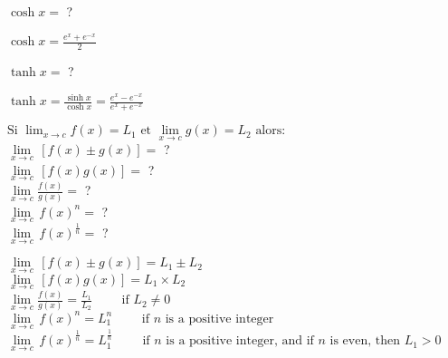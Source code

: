\documentclass[12pt]{article}
\newcommand*{\xfield}[1]{\begin{mdframed}\centering #1\end{mdframed}\bigskip}
\newenvironment{note}{}{}
\begin{document}
\begin{note}
    \xfield{$\cosh x = $ ?}
    \xfield{$\cosh x = \frac {e^x + e^{-x}} {2}$}
\end{note}

\begin{note}
    \xfield{$\tanh x =$ ?}
    \xfield{$\tanh x = \frac{\sinh x}{\cosh x} = \frac {e^x - e^{-x}} {e^x + e^{-x}}$}
\end{note}

\begin{note}
    \xfield{$\text{Si }\lim_{x \to c} f(x) = L_1 \text{ et }\lim\limits_{x \to c} g(x) = L_2 \text{ alors:}$ \\ $\lim\limits_{x \to c} \, [f(x) \pm g(x)] = $ ? \\$\lim\limits_{x \to c} \, [f(x)g(x)] =$ ? \\ $\lim\limits_{x \to c} \frac{f(x)}{g(x)} =$ ?\\ $\lim\limits_{x \to c} \, f(x)^n =$ ?\\ $\lim\limits_{x \to c} \, f(x)^\frac {1} {n} =$ ?}
    \xfield{$\lim\limits_{x \to c} \, [f(x) \pm g(x)] = L_1 \pm L_2$\\$\lim\limits_{x \to c} \, [f(x)g(x)] = L_1 \times L_2$ \\ $\lim\limits_{x \to c} \frac{f(x)}{g(x)} = \frac{L_1}{L_2} \qquad \text{ if } L_2 \ne 0$ \\ $\lim\limits_{x \to c} \, f(x)^n = L_1^n \qquad \text{ if }n \text{ is a positive integer}$ \\ $\lim\limits_{x \to c} \, f(x)^\frac {1} {n} = L_1^\frac {1}{n} \qquad \text{ if }n \text{ is a positive integer, and if } n \text{ is even, then } L_1 > 0$}
\end{note}
\end{document}
